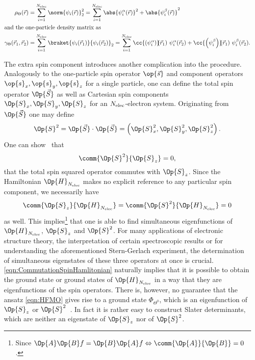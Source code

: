 \begin{rem}
	\begin{align}
		\rho_\Theta(\vec{r}) &= \sum_{i=1}^{\Nelec} \norm{\psi_i(\vec{r})}_2^2
		= \sum_{i=1}^{\Nelec} \abs{\psi_i^\alpha(\vec{r})}^2 + \abs{\psi_i^\beta(\vec{r})}^2 \\
	\intertext{and the one-particle density matrix as}
		\gamma_\Theta(\vec{r}_1,\vec{r}_2)
		&= \sum_{i=1}^{\Nelec} \braket{\psi_i(\vec{r}_1)}{\psi_i(\vec{r}_2)}_2
		= \sum_{i=1}^{\Nelec} \cc{\left(\psi_i^\alpha\right)}\!\!(\vec{r}_1)\  \psi_i^\alpha(\vec{r}_2)
			+ \cc{\left(\psi_i^\beta\right)}\!\!(\vec{r}_1)\  \psi_i^\beta(\vec{r}_2).
	\end{align}

	The extra spin component introduces another complication
	into the \HF procedure.
	Analogously to the one-particle spin operator $\op{\vec{s}}$
	and component operators $\op{s}_x, \op{s}_y, \op{s}_z$
	for a single particle,
	one can define the total spin operator $\Op{\vec{S}}$
	as well as Cartesian spin components $\Op{S}_x, \Op{S}_y, \Op{S}_z$
	for an $N_\text{elec}$-electron system.
	Originating from $\Op{\vec{S}}$ one may define
	\[ \Op{S}^2 = \Op{\vec{S}} \cdot \Op{\vec{S}} = \left(\Op{S}^2_x, \Op{S}^2_y, \Op{S}^2_z\right). \]
	One can show~\cite{Shankar1994} that
	\[ \comm{\Op{S}^2}{\Op{S}_z} = 0, \]
	\ie that the total spin squared operator commutes with $\Op{S}_z$.
	Since the Hamiltonian $\Op{H}_{\Nelec}$ makes no explicit reference
	to any particular spin component,
	we necessarily have
	\begin{equation}
		\comm{\Op{S}_z}{\Op{H}_{\Nelec}} = \comm{\Op{S}^2}{\Op{H}_{\Nelec}} = 0
		\label{eqn:CommutationSpinHamlitonian}
	\end{equation}
	as well.
	This implies\footnote{%
		Since $\Op{A}\Op{B} f = \Op{B}\Op{A} f \Leftrightarrow \comm{\Op{A}}{\Op{B}} = 0$.%
	}
	that one is able to find simultaneous eigenfunctions of $\Op{H}_{\Nelec}$,
	$\Op{S}_z$ and $\Op{S}^2$.
	For many applications of electronic structure theory,
	\eg the interpretation of certain spectroscopic results
	or for understanding the aforementioned Stern-Gerlach experiment,
	the determination of simultaneous eigenstates of these three operators at once
	is crucial.
	\eqref{eqn:CommutationSpinHamlitonian}
	naturally implies that it is possible to obtain the ground state
	or ground states of $\Op{H}_{\Nelec}$
	in a way that they are eigenfunctions of the spin operators.
	There is, however, no guarantee that the \HF ansatz
	\eqref{eqn:HFMO} gives rise to a \HF ground state $\Phi_{\Theta^0}$,
	which is an eigenfunction of $\Op{S}_z$ or $\Op{S}^2$~\cite{Fukutome1981,McWeeny1985}.
	In fact it is rather easy to construct Slater determinants,
	which are neither an eigenstate of $\Op{S}_z$ nor of $\Op{S}^2$.


\end{rem}
